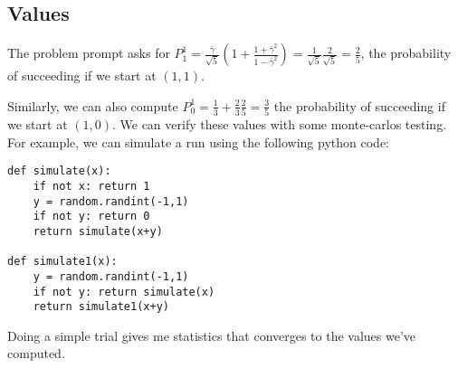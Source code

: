 \subsection*{Values}

The problem prompt asks for $P^1_1 = \frac{\bar\gamma}{\sqrt{5}}\left(1 + \frac{1+\bar\gamma^2}{1 - \bar\gamma^2}\right) = \frac{1}{\sqrt{5}}\frac{2}{\sqrt{5}} = \boxed{\frac{2}{5}}$, the probability of succeeding if we start at $(1,1)$.

Similarly, we can also compute $P_0^1 = \frac13 + \frac23 \frac25 = \boxed{\frac35}$ the probability of succeeding if we start at $(1,0)$. We can verify these values with some monte-carlos testing. For example, we can simulate a run using the following python code:

\begin{verbatim}
def simulate(x):
    if not x: return 1
    y = random.randint(-1,1)
    if not y: return 0
    return simulate(x+y)

def simulate1(x):
    y = random.randint(-1,1)
    if not y: return simulate(x)
    return simulate1(x+y)
\end{verbatim}

Doing a simple trial gives me statistics that converges to the values we've computed.